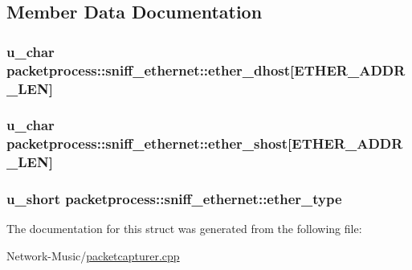 \subsection{Member Data Documentation}
\hypertarget{structpacketprocess_1_1sniff__ethernet_a85e01cf751d0684915d6cd4502b476bc}{
\subsubsection[{ether\-\_\-dhost}]{\setlength{\rightskip}{0pt plus 5cm}u\-\_\-char packetprocess\-::sniff\-\_\-ethernet\-::ether\-\_\-dhost\mbox{[}E\-T\-H\-E\-R\-\_\-\-A\-D\-D\-R\-\_\-\-L\-E\-N\mbox{]}}}\label{structpacketprocess_1_1sniff__ethernet_a85e01cf751d0684915d6cd4502b476bc}
\hypertarget{structpacketprocess_1_1sniff__ethernet_a7fd15b2b34d9dfb673740d90ef101dc8}{
\subsubsection[{ether\-\_\-shost}]{\setlength{\rightskip}{0pt plus 5cm}u\-\_\-char packetprocess\-::sniff\-\_\-ethernet\-::ether\-\_\-shost\mbox{[}E\-T\-H\-E\-R\-\_\-\-A\-D\-D\-R\-\_\-\-L\-E\-N\mbox{]}}}\label{structpacketprocess_1_1sniff__ethernet_a7fd15b2b34d9dfb673740d90ef101dc8}
\hypertarget{structpacketprocess_1_1sniff__ethernet_ac4e709a11c8035f019c15e21dbb8595f}{
\subsubsection[{ether\-\_\-type}]{\setlength{\rightskip}{0pt plus 5cm}u\-\_\-short packetprocess\-::sniff\-\_\-ethernet\-::ether\-\_\-type}}\label{structpacketprocess_1_1sniff__ethernet_ac4e709a11c8035f019c15e21dbb8595f}


The documentation for this struct was generated from the following file\-:\begin{DoxyCompactItemize}
\item 
Network-\/\-Music/\hyperlink{packetcapturer_8cpp}{packetcapturer.\-cpp}\end{DoxyCompactItemize}

